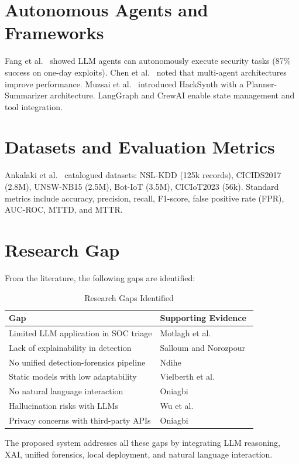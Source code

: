 \documentclass[12pt,a4paper]{report}
\newcommand{\hcell}[1]{\cellcolor{tableheader}\color{white}\textbf{#1}}
\begin{document}
\section{Autonomous Agents and Frameworks}
Fang et al.~\cite{fang2024} showed LLM agents can autonomously execute security tasks (87\% success on one-day exploits). Chen et al.~\cite{chen2024} noted that multi-agent architectures improve performance. Muzsai et al.~\cite{muzsai2024} introduced HackSynth with a Planner-Summarizer architecture. LangGraph and CrewAI enable state management and tool integration.

\section{Datasets and Evaluation Metrics}
Ankalaki et al.~\cite{ankalaki2025} catalogued datasets: NSL-KDD (125k records), CICIDS2017 (2.8M), UNSW-NB15 (2.5M), Bot-IoT (3.5M), CICIoT2023 (56k). Standard metrics include accuracy, precision, recall, F1-score, false positive rate (FPR), AUC-ROC, MTTD, and MTTR.

\section{Research Gap}
From the literature, the following gaps are identified:
\begin{table}[H]
\centering
\caption{Research Gaps Identified}
\begin{tabular}{@{}p{5.5cm}p{7cm}@{}}
\toprule
\hcell{Gap} & \hcell{Supporting Evidence} \\
\midrule
Limited LLM application in SOC triage & Motlagh et al.~\cite{motlagh2024} \\
Lack of explainability in detection & Salloum and Norozpour~\cite{salloum2025} \\
No unified detection-forensics pipeline & Ndihe~\cite{ndihe2024} \\
Static models with low adaptability & Vielberth et al.~\cite{vielberth2020} \\
No natural language interaction & Oniagbi~\cite{oniagbi2024} \\
Hallucination risks with LLMs & Wu et al.~\cite{wu2023} \\
Privacy concerns with third-party APIs & Oniagbi~\cite{oniagbi2024} \\
\bottomrule
\end{tabular}
\end{table}
The proposed system addresses all these gaps by integrating LLM reasoning, XAI, unified forensics, local deployment, and natural language interaction.
\end{document}
